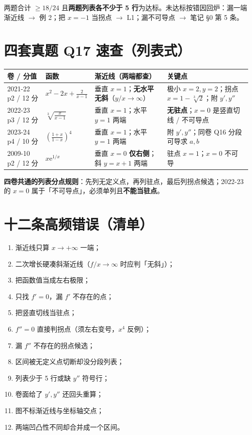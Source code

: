 \documentclass[11pt,a4paper]{ctexart}
\newcommand{\ee}{\mathrm{e}}
\begin{document}
\begin{warnbox}[验收线]
两题合计 $\ge 18/24$ 且\textbf{两题列表各不少于 5 行}为达标。未达标按错因回炉：漏一端渐近线 $\to$ 例 2；把 $x=-1$ 当拐点 $\to$ L1；漏不可导点 $\to$ 笔记 \S 0 第 5 条。
\end{warnbox}

\section{四套真题 Q17 速查（列表式）}

\begin{center}
\footnotesize\setlength{\tabcolsep}{3pt}
\begin{tabular}{@{}p{2.0cm}p{3.5cm}p{4.5cm}p{5.0cm}@{}}
\toprule
卷 / 分值 & 函数 & 渐近线（两端都查） & 关键点 \\
\midrule
2021-22 p2 / 12 分 & $x^2-2x+\frac2{x-1}$ & 垂直 $x=1$；\textbf{无水平无斜}（$y/x\to\infty$） & 极小 $x=2,y=2$；拐点 $x=1-\sqrt[3]2$；附 $y',y''$ \\
2022-23 p3 / 12 分 & $\sqrt[3]{\frac{x}{x-1}}$ & 垂直 $x=1$；水平 $y=1$ 两端 & \textbf{无驻点}；$x=0$ 是竖直切线 / 不可导点 \\
2023-24 p4 / 10 分 & $\left(\frac{1+x}{1-x}\right)^4$ & 垂直 $x=1$；水平 $y=1$ 两端 & 附 $y',y''$；同卷 Q16 分段可导求 $a,b$ \\
2009-10 p2 / 12 分 & $x\ee^{1/x}$ & 垂直 $x=0$ \textbf{仅右侧}；斜 $y=x+1$ 两端 & 驻点 $x=1$；$x=0$ 不可导 \\
\bottomrule
\end{tabular}
\end{center}

\noindent\textbf{四卷共通的列表分点规则}：先列无定义点，再列驻点，最后列拐点候选；2022-23 的 $x=0$ 属于「不可导点」，必须单列且\textbf{不能当驻点}。

\section{十二条高频错误（清单）}

\begin{enumerate}[label=\arabic*.,leftmargin=2em]
\item 渐近线只算 $x\to+\infty$ 一端；
\item 二次增长硬凑斜渐近线（$f/x\to\infty$ 时应判「无斜」）；
\item 把函数值当成左右极限；
\item 只找 $f'=0$，漏 $f'$ 不存在的点；
\item 把竖直切线当驻点；
\item $f''=0$ 直接判拐点（须左右变号，$x^4$ 反例）；
\item 漏 $f''$ 不存在的拐点候选；
\item 区间被无定义点切断却没分段列表；
\item 列表少于 5 行或缺 $y''$ 符号行；
\item 卷面给了 $y',y''$ 还回头重算；
\item 图不标渐近线与坐标轴交点；
\item 两端凹凸性不同却合并成一个区间。
\end{enumerate}
\end{document}
